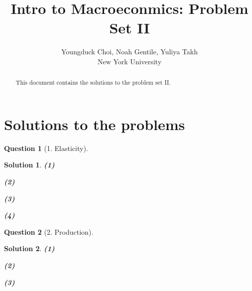 \documentclass{article} %
\title{Intro to Macroeconmics: Problem Set II}
\author{
Youngduck Choi, Noah Gentile, Yuliya Takh \\
New York University \\
}
\theoremstyle{quest}
\newtheorem*{question}{Question}
\newtheorem*{solution}{Solution}
\begin{document}
\maketitle

\begin{abstract}
This document contains the solutions to the problem set II.
\end{abstract}

\section{Solutions to the problems}

\begin{question}[1. Elasticity]
\end{question}
\begin{solution}
\textbf{(1)}

\smallskip

\textbf{(2)}

\smallskip

\textbf{(3)}

\smallskip

\textbf{(4)}
\end{solution}
\begin{question}[2. Production]
\end{question}
\begin{solution}
\textbf{(1)}

\smallskip

\textbf{(2)}

\smallskip

\textbf{(3)}
\end{solution}
\end{document}
